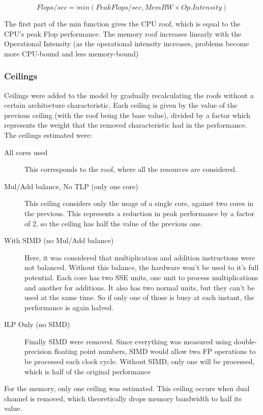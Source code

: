 \documentclass[twocolumn,10pt]{scrartcl}
\begin{document}
$$ Flops/sec = min(Peak Flops/sec, MemBW \times Op. Intensity ) $$

The first part of the $\mathrm{min}$ function gives the CPU roof, which is equal to the CPU's peak Flop performance. The memory roof increases linearly with the Operational Intensity (as the operational intensity increases, problems become more CPU-bound and less memory-bound)

\subsubsection{Ceilings}

Ceilings were added to the model by gradually recalculating the roofs without a certain architecture characteristic. Each ceiling is given by the value of the previous ceiling (with the roof being the base value), divided by a factor which represents the weight that the removed characteristic had in the performance. The ceilings estimated were:
\begin{description}
	\item[All cores used]This corresponds to the roof, where all the resources are considered.
	\item[Mul/Add balance, No TLP (only one core)]This ceiling considers only the usage of a single core, against two cores in the previous. This represents a reduction in peak performance by a factor of 2, so the ceiling has half the value of the previous one.
	\item[With SIMD (no Mul/Add balance)]Here, it was considered that multiplication and addition instructions were not balanced. Without this balance, the hardware won't be used to it's full potential. Each core has two SSE units, one unit to process multiplications and another for additions. It also has two normal units, but they can't be used at the same time. So if only one of those is busy at each instant, the performance is again halved.
	\item[ILP Only (no SIMD)]Finally SIMD were removed. Since everything was measured using double-precision floating point numbers, SIMD would allow two FP operations to be processed each clock cycle. Without SIMD, only one will be processed, which is half of the original performance
\end{description}

For the memory, only one ceiling was estimated. This ceiling occurs when dual channel is removed, which theoretically drops memory bandwidth to half its value.
\end{document}
